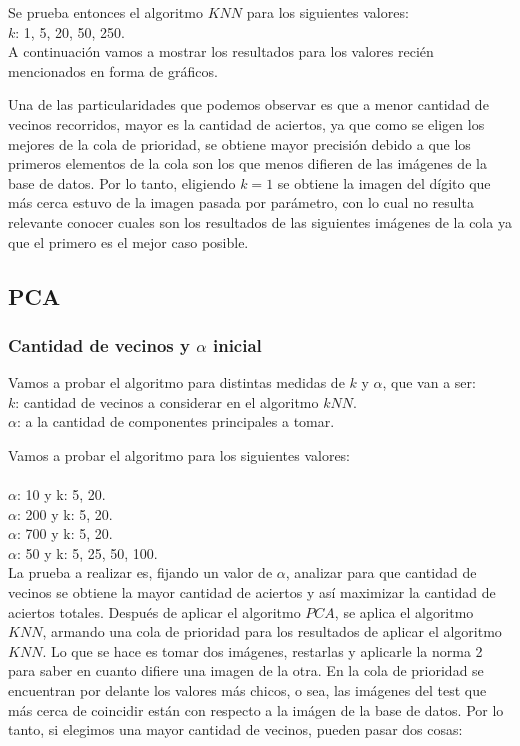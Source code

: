 Se prueba entonces el algoritmo $KNN$ para los siguientes valores:\\
$k$: 1, 5, 20, 50, 250.\\

A continuación vamos a mostrar los resultados para los valores reci\'en mencionados en forma de gráficos.

Una de las particularidades que podemos observar es que a menor cantidad de vecinos recorridos, mayor es la cantidad de aciertos, ya que como se eligen los mejores de la cola de prioridad, se obtiene mayor precisión debido a que los primeros elementos de la cola son los que menos difieren de las imágenes de la base de datos.
Por lo tanto, eligiendo $k = 1$ se obtiene la imagen del dígito que más cerca estuvo de la imagen pasada por parámetro, con lo cual no resulta relevante conocer cuales son los resultados de las siguientes imágenes de la cola ya que el primero es el mejor caso posible.

\subsection{PCA}
\subsubsection{Cantidad de vecinos y $\alpha$ inicial}
Vamos a probar el algoritmo para distintas medidas de $k$ y $\alpha$, que van a ser:\\
$k$: cantidad de vecinos a considerar en el algoritmo $kNN$.\\
$\alpha$: a la cantidad de componentes principales a tomar.

Vamos a probar el algoritmo para los siguientes valores:\\ \\
$\alpha$: 10  y k: 5, 20.\\
$\alpha$: 200 y k: 5, 20.\\
$\alpha$: 700 y k: 5, 20.\\
$\alpha$: 50  y k: 5, 25, 50, 100.\\

La prueba a realizar es, fijando un valor de $\alpha$, analizar para que cantidad de vecinos se obtiene la mayor cantidad de aciertos y así maximizar la cantidad de aciertos totales.
Después de aplicar el algoritmo $PCA$, se aplica el algoritmo $KNN$, armando una cola de prioridad para los resultados de aplicar el algoritmo $KNN$. Lo que se hace es tomar dos imágenes, restarlas y aplicarle la norma 2 para saber en cuanto difiere una imagen de la otra. En la cola de prioridad se encuentran por delante los valores más chicos, o sea, las imágenes del test que más cerca de coincidir están con respecto a la imágen de la base de datos.
Por lo tanto, si elegimos una mayor cantidad de vecinos, pueden pasar dos cosas:

